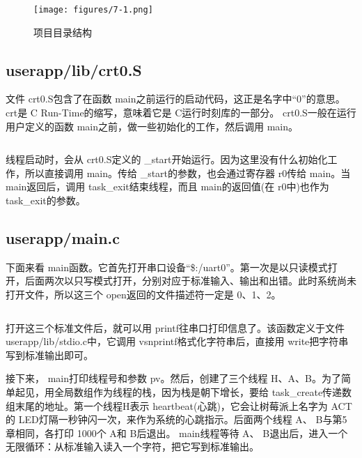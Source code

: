 \documentclass[main.tex]{subfiles}
\begin{document}
\begin{CJK*}{UTF8}{song}
\begin{figure}[htp]
\centering
\texttt{[image: figures/7-1.png]}
\caption{项目目录结构}
\label{figure:7-1}
\end{figure}

\subsection{userapp/lib/crt0.S}
文件 crt0.S包含了在函数 main之前运行的启动代码，这正是名字中“0”的意思。 crt是 C Run-Time的缩写，意味着它是 C运行时刻库的一部分。 crt0.S一般在运行用户定义的函数 main之前，做一些初始化的工作，然后调用 main。

\begin{code}
\label{code:7-2}
\inputminted[linenos,numbersep=5pt,frame=lines,framesep=2mm]{gas}{src/chapter07/userapp/lib/crt0.S}
\end{code}

线程启动时，会从 crt0.S定义的 \_start开始运行。因为这里没有什么初始化工作，所以直接调用 main。传给 \_start的参数，也会通过寄存器 r0传给 main。当 main返回后，调用 task\_\-exit结束线程，而且 main的返回值(在 r0中)也作为 task\_\-exit的参数。

\subsection{userapp/main.c}
下面来看 main函数。它首先打开串口设备“\$:/uart0”。第一次是以只读模式打开，后面两次以只写模式打开，分别对应于标准输入、输出和出错。此时系统尚未打开文件，所以这三个 open返回的文件描述符一定是 0、1、2。

\begin{code}
\label{code:7-3}
\inputminted[firstline=52,lastline=83,linenos,numbersep=5pt,frame=lines,framesep=2mm]{c}{src/chapter07/userapp/main.c}
\end{code}

打开这三个标准文件后，就可以用 printf往串口打印信息了。该函数定义于文件 user\-app\-/lib\-/stdio.c中，它调用 vsn\-printf格式化字符串后，直接用 write把字符串写到标准输出即可。

\par
接下来， main打印线程号和参数 pv。然后，创建了三个线程 H、A、B。为了简单起见，用全局数组作为线程的栈，因为栈是朝下增长，要给 task\_\-create传递数组末尾的地址。第一个线程H表示 heart\-beat(心跳)，它会让树莓派上名字为 ACT的 LED灯隔一秒钟闪一次，来作为系统的心跳指示。后面两个线程 A、 B与第5章相同，各打印 1000个 A和 B后退出。 main线程等待 A、 B退出后，进入一个无限循环：从标准输入读入一个字符，把它写到标准输出。


\end{CJK*}
\end{document}
